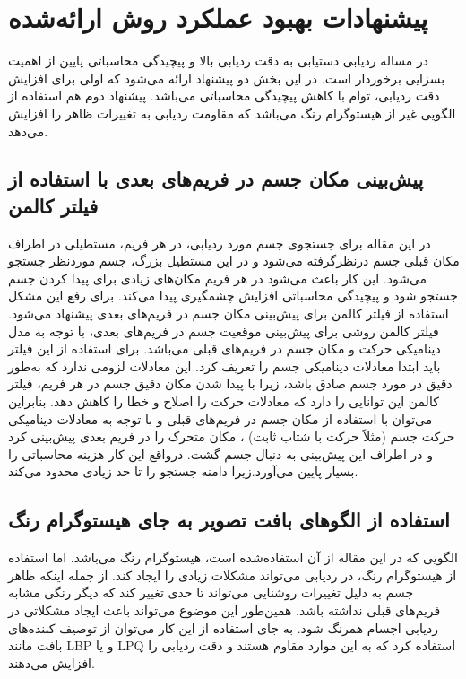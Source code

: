 \documentclass[paper=a4, fontsize=12pt]{article} %
\begin{document}
 
\section{ پیشنهادات بهبود عملکرد روش ارائه‌شده}
در مساله ردیابی دستیابی به دقت ردیابی بالا و پیچیدگی محاسباتی پایین از اهمیت بسزایی برخوردار است. در این بخش دو پیشنهاد ارائه می‌شود که اولی برای افزایش دقت ردیابی، توام با کاهش پیچیدگی محاسباتی می‌باشد. پیشنهاد دوم هم استفاده از الگویی غیر از هیستوگرام رنگ می‌باشد که مقاومت ردیابی به تغییرات ظاهر را افزایش می‌دهد.

\subsection{ پیش‌بینی مکان جسم در فریم‌های بعدی با استفاده از فیلتر کالمن}
در این مقاله برای جستجوی جسم مورد ردیابی، در هر فریم، مستطیلی در اطراف مکان قبلی جسم درنظرگرفته می‌شود و در این مستطیل بزرگ، جسم موردنظر جستجو می‌شود. این کار باعث می‌شود در هر فریم مکان‌های زیادی برای پیدا کردن جسم جستجو شود و پیچیدگی محاسباتی افزایش چشمگیری پیدا می‌کند. برای رفع این مشکل استفاده از فیلتر کالمن برای پیش‌بینی مکان جسم در فریم‌های بعدی پیشنهاد می‌شود.
فیلتر کالمن روشی برای پیش‌بینی موقعیت جسم در فریم‌های بعدی، با توجه به مدل دینامیکی حرکت و مکان جسم در فریم‌های قبلی می‌باشد.
\cite{7Jiang}
 برای استفاده از این فیلتر باید ابتدا معادلات دینامیکی جسم را تعریف کرد. این معادلات لزومی ندارد که به‌طور دقیق در مورد جسم صادق باشد، زیرا با پیدا شدن مکان دقیق جسم در هر فریم، فیلتر کالمن این توانایی را دارد که معادلات حرکت را اصلاح و خطا را کاهش دهد.
بنابراین می‌توان با استفاده از مکان جسم در فریم‌های قبلی و با توجه به معادلات دینامیکی حرکت جسم (مثلاً حرکت با شتاب ثابت) ، مکان متحرک را در فریم بعدی پیش‌بینی کرد و در اطراف این پیش‌بینی به دنبال جسم گشت. درواقع این کار هزینه محاسباتی را بسیار پایین می‌آورد.زیرا دامنه جستجو را تا حد زیادی محدود می‌کند.

\subsection{ استفاده از الگوهای بافت تصویر به جای هیستوگرام رنگ}
الگویی که در این مقاله از آن استفاده‌شده است، هیستوگرام رنگ می‌باشد. اما استفاده از هیستوگرام رنگ، در ردیابی می‌تواند مشکلات زیادی را ایجاد کند. از جمله اینکه ظاهر جسم به دلیل تغییرات روشنایی می‌تواند تا حدی تغییر کند که دیگر رنگی مشابه فریم‌های قبلی نداشته باشد. همین‌طور این موضوع می‌تواند باعث ایجاد مشکلاتی در ردیابی اجسام همرنگ شود.
به جای استفاده از این کار می‌توان از توصیف کننده‌های بافت مانند LBP و یا
 LPQ
  \cite{8Ning}
  استفاده کرد که به این موارد مقاوم هستند و دقت ردیابی را افزایش می‌دهند.
\end{document}
